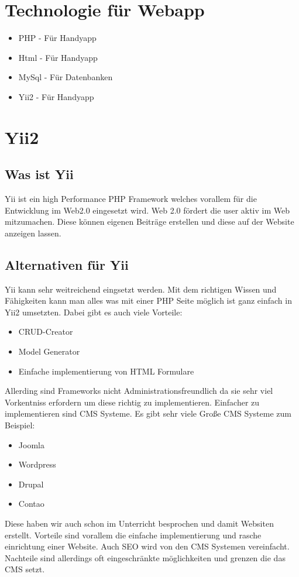 \newpage	
\def \currentAuthor {Florian Tipotsch}
	\section{Technologie für Webapp}
\begin{itemize}
	\item PHP - Für Handyapp
	\item Html - Für Handyapp 	
	\item MySql - Für Datenbanken
	\item Yii2 - Für Handyapp
\end{itemize}
	\section{Yii2}
	\subsection{Was ist Yii}
	Yii ist ein high Performance PHP Framework welches vorallem für die Entwicklung im Web2.0 eingesetzt wird. Web 2.0 fördert die user aktiv im Web mitzumachen. Diese können eigenen Beiträge erstellen und diese auf der Website anzeigen lassen.
\cite{https://en.wikipedia.org/wiki/Web_2.0}
	\subsection{Alternativen für Yii}
	Yii kann sehr weitreichend eingsetzt werden. Mit dem richtigen Wissen und Fähigkeiten kann man alles was mit einer PHP Seite möglich ist ganz einfach in Yii2 umsetzten. Dabei gibt es auch viele Vorteile:
\begin{itemize}
\item CRUD-Creator
\item Model Generator
\item Einfache implementierung von HTML Formulare
\end{itemize}
Allerding sind Frameworks nicht Administrationsfreundlich da sie sehr viel Vorkentniss erfordern um diese richtig zu implementieren. Einfacher zu implementieren sind CMS Systeme. Es gibt sehr viele Große CMS Systeme zum Beispiel:
\begin{itemize}
\item Joomla
\item Wordpress
\item Drupal
\item Contao
\end{itemize}
Diese haben wir auch schon im Unterricht besprochen und damit Websiten erstellt. Vorteile sind vorallem die einfache implementierung und rasche einrichtung einer Website. Auch SEO wird von den CMS Systemen vereinfacht. Nachteile sind allerdings oft eingeschränkte möglichkeiten und grenzen die das CMS setzt.

